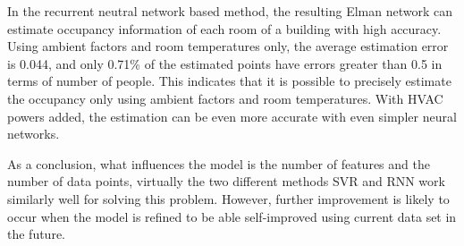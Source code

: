 \documentclass[acmtodaes]{acmtrans2m}
\begin{document}
In the recurrent neutral network based method, the resulting Elman
network can estimate occupancy information of each room of a building
with high accuracy. Using ambient factors and room temperatures only,
the average estimation error is 0.044, and only 0.71\% of the
estimated points have errors greater than 0.5 in terms of number of
people. This indicates that it is possible to precisely estimate the
occupancy only using ambient factors and room temperatures. With HVAC
powers added, the estimation can be even more accurate with even
simpler neural networks.

As a conclusion, what influences the model is the number of features
and the number of data points, virtually the two different methods SVR
and RNN work similarly well for solving this problem. However,
further improvement is likely to occur when the model is refined to be
able self-improved using current data set in the future.







%
%


\end{document}
